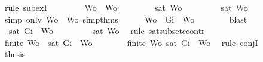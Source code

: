 \begin{isabellebody}
\ {\isacharparenleft}rule\ subexI{\isacharparenright}\isanewline
\ \ \isamarkupfalse%
\isanewline
\ \ \ \ \isamarkupfalse%
\ {\isachardoublequoteopen}Wo\ {\isacharequal}\ Wo{\isacharprime}{\isachardoublequoteclose}\isanewline
\ \ \ \ \isamarkupfalse%
\ \isamarkupfalse%
\ {\isachardoublequoteopen}{\isasymnot}\ {\isacharparenleft}sat\ Wo{\isacharprime}{\isacharparenright}{\isachardoublequoteclose}\isanewline
\ \ \ \ \ \ \isamarkupfalse%
\ {\isacartoucheopen}{\isasymnot}\ sat\ Wo{\isacartoucheclose}\ \isamarkupfalse%
\ {\isacharparenleft}simp\ only{\isacharcolon}\ {\isacartoucheopen}Wo\ {\isacharequal}\ Wo{\isacharprime}{\isacartoucheclose}\ simp{\isacharunderscore}thms{\isacharparenleft}{}{\isacharparenright}{\isacharparenright}\isanewline
\ \ \ \ \isamarkupfalse%
\ {\isachardoublequoteopen}Wo{\isacharprime}\ {\isasymsubseteq}\ {\isacharbraceleft}Gi{\isacharbraceright}\ {\isasymunion}\ Wo{\isacharprime}{\isachardoublequoteclose}\isanewline
\ \ \ \ \ \ \isamarkupfalse%
\ blast\isanewline
\ \ \ \ \isamarkupfalse%
\ \isamarkupfalse%
\ {\isachardoublequoteopen}{\isasymnot}\ {\isacharparenleft}sat\ {\isacharparenleft}{\isacharbraceleft}Gi{\isacharbraceright}\ {\isasymunion}\ Wo{\isacharprime}{\isacharparenright}{\isacharparenright}{\isachardoublequoteclose}\isanewline
\ \ \ \ \ \ \isamarkupfalse%
\ {\isacartoucheopen}{\isasymnot}\ {\isacharparenleft}sat\ Wo{\isacharprime}{\isacharparenright}{\isacartoucheclose}\ \isamarkupfalse%
\ {\isacharparenleft}rule\ sat{\isacharunderscore}subset{\isacharunderscore}ccontr{\isacharparenright}\isanewline
\ \ \ \ \isamarkupfalse%
\ {\isachardoublequoteopen}finite\ Wo{\isacharprime}\ {\isasymand}\ {\isasymnot}{\isacharparenleft}sat\ {\isacharparenleft}{\isacharbraceleft}Gi{\isacharbraceright}\ {\isasymunion}\ Wo{\isacharprime}{\isacharparenright}{\isacharparenright}{\isachardoublequoteclose}\isanewline
\ \ \ \ \ \ \isamarkupfalse%
\ {\isacartoucheopen}finite\ Wo{\isacharprime}{\isacartoucheclose}\ {\isacartoucheopen}{\isasymnot}{\isacharparenleft}sat\ {\isacharparenleft}{\isacharbraceleft}Gi{\isacharbraceright}\ {\isasymunion}\ Wo{\isacharprime}{\isacharparenright}{\isacharparenright}{\isacartoucheclose}\ \isamarkupfalse%
\ {\isacharparenleft}rule\ conjI{\isacharparenright}\isanewline
\ \ \ \ \isamarkupfalse%
\ {\isacharquery}thesis\isanewline
\ \ \ \ \ \ \isamarkupfalse%

\end{isabellebody}
